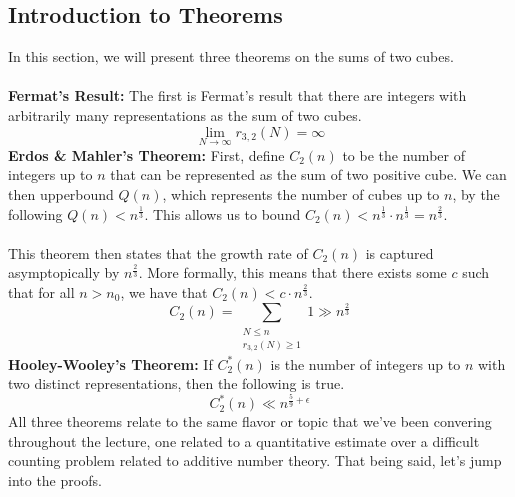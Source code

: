 \documentclass[8pt]{extarticle}
\begin{document}
\subsection{Introduction to Theorems}
In this section, we will present three theorems on the sums of two cubes. \\
\\
\textbf{Fermat's Result:} The first is Fermat's result that there are integers with arbitrarily many representations as the sum of two cubes.
$$
\lim_{N\rightarrow\infty} r_{3,2}(N) = \infty
$$
\textbf{Erdos \& Mahler's Theorem:} First, define $C_2(n)$ to be the number of integers up to $n$ that can be represented as the sum of two positive cube. We can then upperbound $Q(n)$, which represents the number of cubes up to $n$, by the following $Q(n) < n^{\frac{1}{3}}$. This allows us to bound $C_2(n) < n^{\frac{1}{3}} \cdot n^{\frac{1}{3}} = n^{\frac{2}{3}}$. \\
\\
This theorem then states that the growth rate of $C_2(n)$ is captured asymptopically by $n^{\frac{2}{3}}$. More formally, this means that there exists some $c$ such that for all $n > n_0$, we have that $C_2(n) < c \cdot n^{\frac{2}{3}}$.
$$
C_2(n) = \sum_{\substack{N \leq n \\ r_{3,2}(N) \geq 1}} 1 \gg n^{\frac{2}{3}}
$$
\textbf{Hooley-Wooley's Theorem:} If $C^*_2(n)$ is the number of integers up to $n$ with two distinct representations, then the following is true.
$$
C^*_2(n) \ll n^{\frac{5}{9} + \epsilon}
$$
All three theorems relate to the same flavor or topic that we've been convering throughout the lecture, one related to a quantitative estimate over a difficult counting problem related to additive number theory. That being said, let's jump into the proofs.
\end{document}

